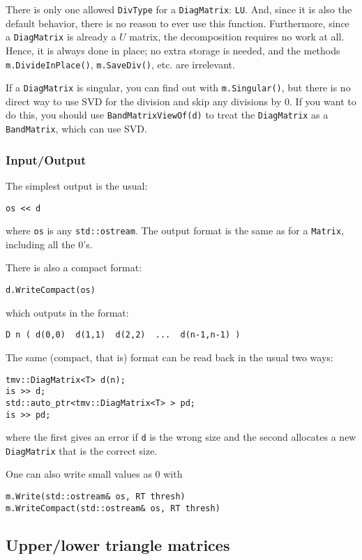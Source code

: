 \documentclass[twoside,letterpaper,11pt]{article}
\renewcommand{\tt}[1]{{\texttt {#1}}}
\begin{document}
There is only one allowed \tt{DivType} for a \tt{DiagMatrix}: \tt{LU}. 
And, since it is also the default behavior,
there is no reason to ever use this function.  Furthermore, since a \tt{DiagMatrix}
is already a $U$ matrix, the decomposition requires no work at all.
Hence, it is always done in place; no extra storage is needed, and 
the methods \tt{m.DivideInPlace()}, \tt{m.SaveDiv()}, etc. are irrelevant.

If a \tt{DiagMatrix} is singular, you can find out with \tt{m.Singular()},
but there is no direct way to use SVD for the division and skip any
divisions by 0.  If you want to do this, you should use \tt{BandMatrixViewOf(d)} to 
treat the \tt{DiagMatrix} as a \tt{BandMatrix}, which can use SVD.

\subsubsection{Input/Output}

The simplest output is the usual:
\begin{verbatim}
os << d
\end{verbatim}
where \tt{os} is any \tt{std::ostream}.
The output format is the same as for a \tt{Matrix}, including all the 0's.

There is also a compact format:
\begin{verbatim}
d.WriteCompact(os)
\end{verbatim}
which outputs in the format:
\begin{verbatim}
D n ( d(0,0)  d(1,1)  d(2,2)  ...  d(n-1,n-1) )
\end{verbatim}

The same (compact, that is) format can be read back in the usual two ways:
\begin{verbatim}
tmv::DiagMatrix<T> d(n);
is >> d;
std::auto_ptr<tmv::DiagMatrix<T> > pd;
is >> pd;
\end{verbatim}
where the first gives an error if \tt{d} is the wrong size and the second allocates
a new \tt{DiagMatrix} that is the correct size.

One can also write small values as 0 with
\begin{verbatim}
m.Write(std::ostream& os, RT thresh)
m.WriteCompact(std::ostream& os, RT thresh)
\end{verbatim}

\subsection{Upper/lower triangle matrices}
\label{trimatrix}
\end{document}
